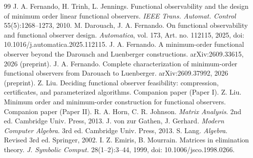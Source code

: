 \documentclass[journal]{IEEEtran}
\theoremstyle{plainn}
\theoremstyle{remark}
\begin{document}
\begin{thebibliography}{99}
 J. A. Fernando, H. Trinh, L. Jennings. Functional observability and the design of minimum order linear functional observers. \emph{IEEE Trans. Automat. Control} 55(5):1268--1273, 2010.
 M. Darouach, J. A. Fernando. On functional observability and functional observer design. \emph{Automatica}, vol. 173, Art. no. 112115, 2025, doi: 10.1016/j.automatica.2025.112115.
 J. A. Fernando. A minimum-order functional observer beyond the Darouach and Luenberger constructions. arXiv:2609.33615, 2026 (preprint).
 J. A. Fernando. Complete characterization of minimum-order functional observers from Darouach to Luenberger. arXiv:2609.37992, 2026 (preprint).
 Z. Liu. Deciding functional observer feasibility: compression, certificates, and parameterized algorithms. Companion paper (Paper I).
 Z. Liu. Minimum order and minimum-order construction for functional observers. Companion paper (Paper II).
 R. A. Horn, C. R. Johnson. \emph{Matrix Analysis}. 2nd ed. Cambridge Univ. Press, 2013.
 J. von zur Gathen, J. Gerhard. \emph{Modern Computer Algebra}. 3rd ed. Cambridge Univ. Press, 2013.
 S. Lang. \emph{Algebra}. Revised 3rd ed. Springer, 2002.
 I. Z. Emiris, B. Mourrain. Matrices in elimination theory. \emph{J. Symbolic Comput.} 28(1--2):3--44, 1999, doi: 10.1006/jsco.1998.0266.
\end{thebibliography}
\end{document}
